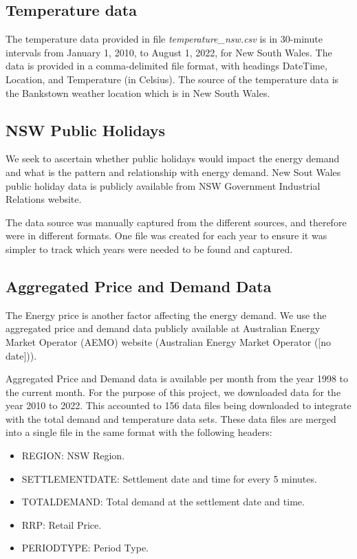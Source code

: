 \documentclass[mstat,12pt]{unswthesis}
\begin{document}
\hypertarget{temperature-data}{%
\subsection{Temperature data}\label{temperature-data}}

The temperature data provided in file \emph{temperature\_nsw.csv} is in
30-minute intervals from January 1, 2010, to August 1, 2022, for New
South Wales. The data is provided in a comma-delimited file format, with
headings DateTime, Location, and Temperature (in Celsius). The source of
the temperature data is the Bankstown weather location which is in New
South Wales.

\hypertarget{nsw-public-holidays}{%
\subsection{NSW Public Holidays}\label{nsw-public-holidays}}

We seek to ascertain whether public holidays would impact the energy
demand and what is the pattern and relationship with energy demand. New
Sout Wales public holiday data is publicly available from NSW Government
Industrial Relations website.

The data source was manually captured from the different sources, and
therefore were in different formats. One file was created for each year
to ensure it was simpler to track which years were needed to be found
and captured.

\hypertarget{aggregated-price-and-demand-data}{%
\subsection{Aggregated Price and Demand
Data}\label{aggregated-price-and-demand-data}}

The Energy price is another factor affecting the energy demand. We use
the aggregated price and demand data publicly available at Australian
Energy Market Operator (AEMO) website (Australian Energy Market Operator
({[}no date{]})).

Aggregated Price and Demand data is available per month from the year
1998 to the current month. For the purpose of this project, we
downloaded data for the year 2010 to 2022. This accounted to 156 data
files being downloaded to integrate with the total demand and
temperature data sets. These data files are merged into a single file in
the same format with the following headers:

\begin{itemize}
\tightlist
\item
  REGION: NSW Region.
\item
  SETTLEMENTDATE: Settlement date and time for every 5 minutes.
\item
  TOTALDEMAND: Total demand at the settlement date and time.
\item
  RRP: Retail Price.
\item
  PERIODTYPE: Period Type.
\end{itemize}
\end{document}
